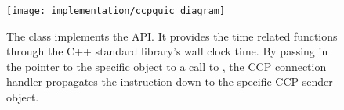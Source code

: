 \begin{figure}[h]
\centering
\texttt{[image: implementation/ccpquic\_diagram]}
\caption{The  class implements the \libccp API. It provides the time related functions through the C++ standard library's wall clock time. By passing in the pointer to the specific  object to a call to , the CCP connection handler propagates the instruction down to the specific CCP sender object.}
\label{fig:ccpquic_diagram}
\end{figure}

